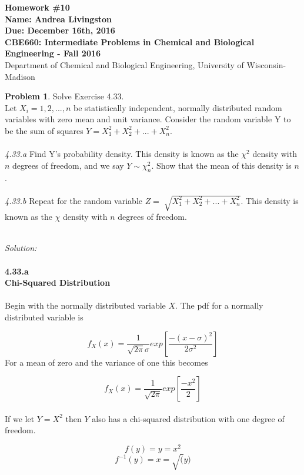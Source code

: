 \documentclass[10pt]{article}
\begin{document}
\begin{center}
{\Large\bf Homework \#10}\\
 {\bf Name: Andrea Livingston}\\
 {\bf Due: December 16th, 2016}\\
 {\bf CBE660: Intermediate Problems in Chemical and Biological
Engineering\; -\; Fall 2016}\\
Department of Chemical and Biological Engineering, University of Wisconsin-Madison
\end{center}

\noindent\colorbox{mygray}{\begin{minipage}{\textwidth}
  {\bf Problem 1}. Solve Exercise 4.33. \\
  Let $X_i = 1, 2, ..., n$ be statistically independent, normally distributed random variables with zero mean and unit variance. Consider the random variable Y to be the sum of squares $Y = X_1^2 + X_2^2 + ... + X_n^2$. \\ \\
  \textit{4.33.a} Find Y's probability density. This density is known as the $\chi^2$ density with $n$ degrees of freedom, and we say $Y \sim \chi_n^2$. Show that the mean of this density is $n$. \\ \\
  \textit{4.33.b} Repeat for the random variable $Z=\sqrt[]{X_1^2 + X_2^2 + ... + X_n^2}$. This density is known as the $\chi$ density with $n$ degrees of freedom. 
  
\end{minipage}}
\\

{\em Solution:}   
\\
\\
{\bf 4.33.a \\ Chi-Squared Distribution}
\\
\\
Begin with the normally distributed variable $X$. The pdf for a normally distributed variable is

\[ f_X(x)=\frac{1}{\sqrt{2\pi}\sigma}exp\left[ \frac{-(x-\sigma)^2}{2\sigma^2} \right] \]
For a mean of zero and the variance of one this becomes

\[ f_X(x)=\frac{1}{\sqrt{2\pi}}exp\left[ \frac{-x^2}{2} \right] \]
\\
If we let $Y=X^2$ then $Y$ also has a chi-squared distribution with one degree of freedom.

\[ f(y) = y=x^2 \]
\[ f^{-1}(y)=x=\sqrt(y) \]
\\
\end{document}
